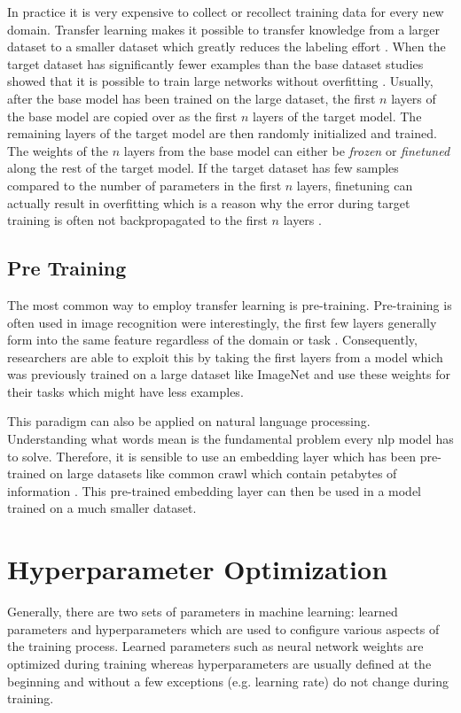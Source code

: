 In practice it is very expensive to collect or recollect training data for every new domain. Transfer learning makes it possible to transfer knowledge from a larger dataset to a smaller dataset which greatly reduces the labeling effort \cite{Blitzer2007}. When the target dataset has significantly fewer examples than the base dataset studies showed that it is possible to train large networks without overfitting \cite{Donahue2013}\cite{Zeiler2014}. Usually, after the base model has been trained on the large dataset, the first $n$ layers of the base model are copied over as the first $n$ layers of the target model. The remaining layers of the target model are then randomly initialized and trained. The weights of the $n$ layers from the base model can either be \textit{frozen} or \textit{finetuned} along the rest of the target model. If the target dataset has few samples compared to the number of parameters in the first $n$ layers, finetuning can actually result in overfitting which is a reason why the error during target training is often not backpropagated to the first $n$ layers \cite{Yosinski2014}.

\subsection*{Pre Training}
The most common way to employ transfer learning is pre-training. 
Pre-training is often used in image recognition were interestingly, the first few layers generally form into the same feature regardless of the domain or task \cite{Yosinski2014}. Consequently, researchers are able to exploit this by taking the first layers from a model which was previously trained on a large dataset like ImageNet \cite{Russakovsky2015} and use these weights for their tasks which might have less examples.

This paradigm can also be applied on natural language processing. Understanding what words mean is the fundamental problem every \gls{nlp} model has to solve. Therefore, it is sensible to use an embedding layer which has been pre-trained on large datasets like common crawl which contain petabytes of information \cite{commonCrawl}. This pre-trained embedding layer can then be used in a model trained on a much smaller dataset.
 
\section{Hyperparameter Optimization}

Generally, there are two sets of parameters in machine learning: learned parameters and hyperparameters which are used to configure various aspects of the training process. Learned parameters such as neural network weights are optimized during training whereas hyperparameters are usually defined at the beginning and without a few exceptions {(e.g. learning rate)} do not change during training.

